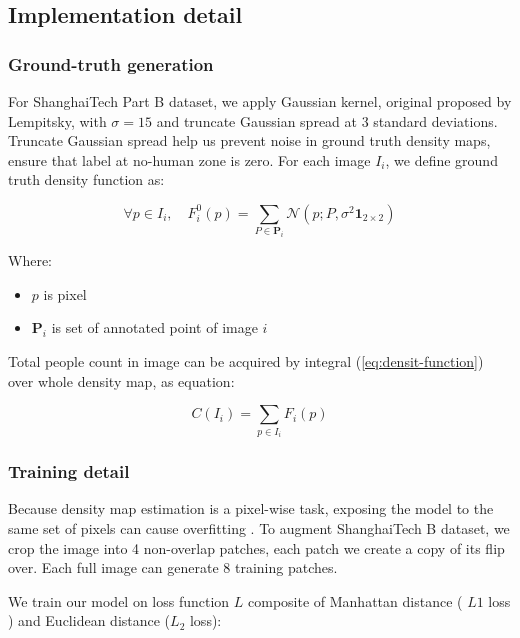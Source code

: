 \subsection{Implementation detail}

\subsubsection{Ground-truth generation} \hfill

For ShanghaiTech Part B dataset, we apply Gaussian kernel, original proposed by Lempitsky, \cite{lempitsky2010learning} with $\sigma = 15$ and truncate Gaussian spread at 3 standard deviations. Truncate Gaussian spread help us prevent noise in ground truth density maps, ensure that label at no-human zone is zero. For each image $I_i$, we define ground truth density function as: 

\begin{equation} \label{eq:densit-function}
\forall p \in I_{i}, \quad F_{i}^{0}(p)=\sum_{P \in \mathbf{P}_{i}} \mathcal{N}\left(p ; P, \sigma^{2} \mathbf{1}_{2 \times 2}\right) 
\end{equation}

Where: 
\begin{itemize}
  \item $p$ is pixel
  \item $\mathbf{P}_{i}$ is set of annotated point of image $i$
\end{itemize}

Total people count in image can be acquired by integral (\ref{eq:densit-function}) over whole density map, as equation: 

\begin{equation} \label{eq:count}
C(I_i) = \sum_{p \in I_{i}} F_{i}(p)
\end{equation}



\subsubsection{Training detail} \hfill

 Because density map estimation is a pixel-wise task, exposing the model to the same set of pixels can cause overfitting \cite{marsden2016fully}. To augment ShanghaiTech B dataset, we crop the image into 4 non-overlap patches, each patch we create a copy of its flip over. Each full image can generate 8 training patches. 

We train our model on loss function $L$ composite of Manhattan distance ( $L1$ loss ) and Euclidean distance ($L_2$ loss): 

